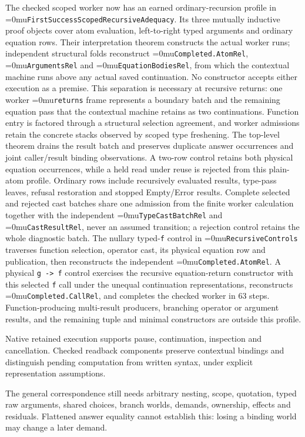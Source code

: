 \documentclass[11pt,a4paper]{article}
\newcommand{\name}[1]{\textup{\Urlmuskip=0mu\relax\nolinkurl{#1}}}
\begin{document}
The checked scoped worker now has an earned ordinary-recursion profile in
\name{FirstSuccessScopedRecursiveAdequacy}.  Its three mutually inductive
proof objects cover atom evaluation, left-to-right typed arguments and
ordinary equation rows.  Their interpretation theorem constructs the actual
worker runs; independent structural folds reconstruct
\name{Completed.AtomRel}, \name{ArgumentsRel} and
\name{EquationBodiesRel}, from which the contextual machine runs above any
actual saved continuation.  No constructor accepts either execution as a
premise.  This separation is necessary at recursive returns: one worker
\name{returns} frame represents a boundary batch and the remaining equation
pass that the contextual machine retains as two continuations.  Function
entry is factored through a structural selection agreement, and worker
admissions retain the concrete stacks observed by scoped type freshening.
The top-level theorem drains the
result batch and preserves duplicate answer occurrences and joint
caller/result binding observations.  A two-row control retains both physical
equation occurrences, while a held read under reuse is rejected from this
plain-atom profile.  Ordinary rows include recursively evaluated results,
type-pass leaves, refusal restoration and stopped Empty/Error results.
Complete selected and rejected cast batches share one admission from the
finite worker calculation together with the independent
\name{TypeCastBatchRel} and \name{CastResultRel}, never an assumed transition;
a rejection control retains the whole diagnostic batch.  The nullary
typed-\texttt{f} control in
\name{RecursiveControls} traverses function selection, operator cast, its
physical equation row and publication, then reconstructs the independent
\name{Completed.AtomRel}.  A physical \texttt{g -> f} control exercises the
recursive equation-return constructor with this selected \texttt{f} call
under the unequal continuation representations, reconstructs
\name{Completed.CallRel}, and completes the checked worker in 63 steps.
Function-producing multi-result producers,
branching operator or argument results, and the remaining tuple and minimal
constructors are outside this profile.

Native retained execution supports pause, continuation, inspection and
cancellation. Checked readback components preserve contextual bindings and
distinguish pending computation from written syntax, under explicit
representation assumptions.

The general correspondence still needs arbitrary nesting, scope, quotation,
typed raw arguments, shared choices, branch worlds, demands, ownership,
effects and residuals. Flattened answer equality cannot establish this:
losing a binding world may change a later demand.
\end{document}
